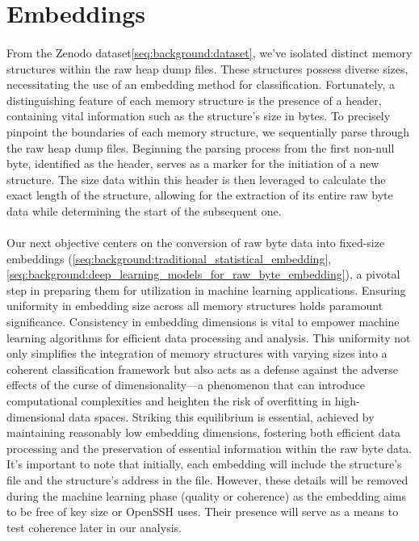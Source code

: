         
    \section{Embeddings}
        \paragraph{}From the Zenodo dataset\ref{seq:background:dataset}, we've isolated distinct memory structures within the raw heap dump files. These structures possess diverse sizes, necessitating the use of an embedding method for classification. Fortunately, a distinguishing feature of each memory structure is the presence of a header, containing vital information such as the structure's size in bytes. To precisely pinpoint the boundaries of each memory structure, we sequentially parse through the raw heap dump files. Beginning the parsing process from the first non-null byte, identified as the header, serves as a marker for the initiation of a new structure. The size data within this header is then leveraged to calculate the exact length of the structure, allowing for the extraction of its entire raw byte data while determining the start of the subsequent one.
        
        \paragraph{}Our next objective centers on the conversion of raw byte data into fixed-size embeddings (\ref{seq:background:traditional_statistical_embedding}, \ref{seq:background:deep_learning_models_for_raw_byte_embedding}), a pivotal step in preparing them for utilization in machine learning applications. Ensuring uniformity in embedding size across all memory structures holds paramount significance. Consistency in embedding dimensions is vital to empower machine learning algorithms for efficient data processing and analysis. This uniformity not only simplifies the integration of memory structures with varying sizes into a coherent classification framework but also acts as a defense against the adverse effects of the curse of dimensionality—a phenomenon that can introduce computational complexities and heighten the risk of overfitting in high-dimensional data spaces. Striking this equilibrium is essential, achieved by maintaining reasonably low embedding dimensions, fostering both efficient data processing and the preservation of essential information within the raw byte data. It's important to note that initially, each embedding will include the structure's file and the structure's address in the file. However, these details will be removed during the machine learning phase (quality or coherence) as the embedding aims to be free of key size or OpenSSH uses. Their presence will serve as a means to test coherence later in our analysis.

